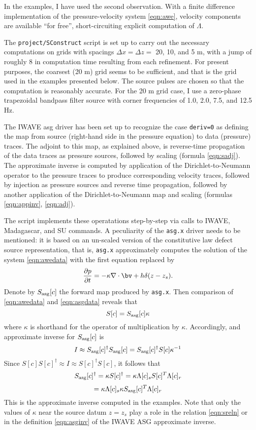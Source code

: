 In the examples, I have used the second observation. With a finite difference implementation of the pressure-velocity system \ref{eqn:awe}, velocity components are available ``for free'', short-circuiting explicit computation of $\Lambda$.

The  {\tt project/SConstruct} script is set up to carry out the necessary computations on grids with spacings $\Delta x = \Delta z = $ 20, 10, and 5 m, with a jump of roughly 8 in computation time resulting from each refinement. For present purposes, the coarsest (20 m) grid seems to be sufficient, and that is the grid used in the examples presented below. The source pulses are chosen so that the computation is reasonably accurate. For the 20 m grid case, I use a zero-phase trapezoidal bandpass filter source with corner frequencies of 1.0, 2.0, 7.5, and 12.5 Hz.

The IWAVE asg driver has been set up to recognize the case {\tt deriv=0} as defining the map from source (right-hand side in the pressure equation) to data (pressure) traces. The adjoint to this map, as explained above, is reverse-time propagation of the data traces as pressure sources, followed by scaling (formula \ref{eqn:sadj}). The approximate inverse is computed by application of the Dirichlet-to-Neumann operator to the pressure traces to produce corresponding velocity traces, followed by injection as pressure sources and reverse time propagation, followed by another application of the Dirichlet-to-Neumann map and scaling (formulas \ref{eqn:appinv}, \ref{eqn:adj}).

The script implements these operatations step-by-step via calls to IWAVE, Madagascar, and SU commands. A peculiarity of the {\tt asg.x} driver needs to be mentioned: it is based on an un-scaled version of the constitutive law defect source representation, that is, {\tt asg.x} approximately computes the solution of the system \ref{eqn:awedata} with the first equation replaced by
\begin{equation}
\label{eqn:asgdata}
\frac{\partial p}{\partial t}  =  - \kappa \nabla \cdot \bv +
h \delta(z-z_s).
\end{equation}
Denote by $S_{\rm asg}[c]$ the forward map produced by {\tt asg.x}. Then comparison of \ref{eqn:awedata} and \ref{eqn:asgdata} reveals that
\begin{equation}
\label{eqn:sreln}
S[c]=S_{\rm asg}[c]\kappa
\end{equation}
where $\kappa$ is shorthand for the operator of multiplication by $\kappa$. Accordingly, and approximate inverse for $S_{\rm asg}[c]$ is
\[
I \approx S_{\rm asg}[c]^{\dagger}S_{\rm asg}[c] = S_{\rm asg}[c]^{\dagger}S[c]\kappa^{-1}
\]
Since $S[c]S[c]^{\dagger} \approx I \approx S[c]^{\dagger}S[c]$, it follows that
\[
S_{\rm asg}[c]^{\dagger}=\kappa S[c]^{\dagger} = \kappa\Lambda[c]_s S[c]^T \Lambda[c]_r 
\]
\begin{equation}
\label{eqn:asginv}
= \kappa \Lambda[c]_s \kappa S_{\rm asg}[c]^T\Lambda[c]_r
\end{equation}
This is the approximate inverse computed in the examples. Note that
only the values of $\kappa$ near the source datum $z=z_s$ play a role
in the relation \ref{eqn:sreln} or in the definition \ref{eqn:asginv}
of the IWAVE ASG approximate inverse.


